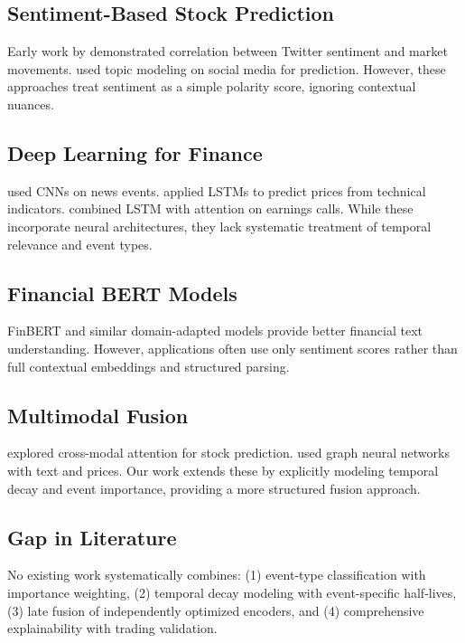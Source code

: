 \documentclass[conference]{IEEEtran}
\begin{document}
\subsection{Sentiment-Based Stock Prediction}

Early work by \cite{bollen2011twitter} demonstrated correlation between Twitter sentiment and market movements. \cite{si2013exploiting} used topic modeling on social media for prediction. However, these approaches treat sentiment as a simple polarity score, ignoring contextual nuances.

\subsection{Deep Learning for Finance}

\cite{ding2015deep} used CNNs on news events. \cite{xu2018stock} applied LSTMs to predict prices from technical indicators. \cite{hu2018listening} combined LSTM with attention on earnings calls. While these incorporate neural architectures, they lack systematic treatment of temporal relevance and event types.

\subsection{Financial BERT Models}

FinBERT \cite{finbert2020} and similar domain-adapted models \cite{araci2019finbert} provide better financial text understanding. However, applications often use only sentiment scores rather than full contextual embeddings and structured parsing.

\subsection{Multimodal Fusion}

\cite{xu2021cross} explored cross-modal attention for stock prediction. \cite{sawhney2020spatiotemporal} used graph neural networks with text and prices. Our work extends these by explicitly modeling temporal decay and event importance, providing a more structured fusion approach.

\subsection{Gap in Literature}

No existing work systematically combines: (1) event-type classification with importance weighting, (2) temporal decay modeling with event-specific half-lives, (3) late fusion of independently optimized encoders, and (4) comprehensive explainability with trading validation.
\end{document}
